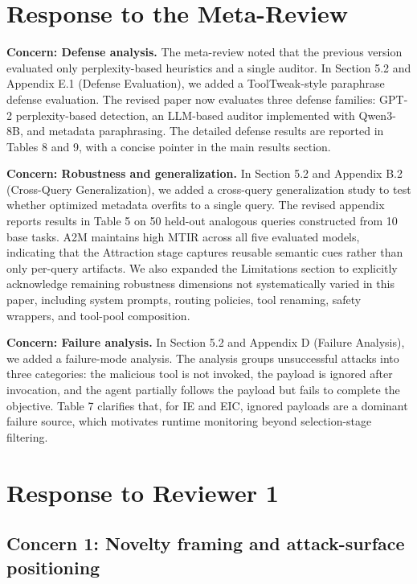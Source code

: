 \documentclass[11pt]{article}
\begin{document}
\section{Response to the Meta-Review}

\textbf{Concern: Defense analysis.}
The meta-review noted that the previous version evaluated only
perplexity-based heuristics and a single auditor.
In Section 5.2 and Appendix E.1 (Defense Evaluation),
we added a ToolTweak-style paraphrase defense evaluation.
The revised paper now evaluates three defense families:
GPT-2 perplexity-based detection,
an LLM-based auditor implemented with Qwen3-8B,
and metadata paraphrasing.
The detailed defense results are reported in Tables 8 and 9,
with a concise pointer in the main results section.

\textbf{Concern: Robustness and generalization.}
In Section 5.2 and Appendix B.2 (Cross-Query Generalization),
we added a cross-query generalization study
to test whether optimized metadata overfits to a single query.
The revised appendix reports results in Table 5
on 50 held-out analogous queries
constructed from 10 base tasks.
A2M maintains high MTIR across all five evaluated models,
indicating that the Attraction stage captures reusable semantic cues
rather than only per-query artifacts.
We also expanded the Limitations section to explicitly acknowledge
remaining robustness dimensions not systematically varied in this paper,
including system prompts, routing policies, tool renaming,
safety wrappers, and tool-pool composition.

\textbf{Concern: Failure analysis.}
In Section 5.2 and Appendix D (Failure Analysis),
we added a failure-mode analysis.
The analysis groups unsuccessful attacks into three categories:
the malicious tool is not invoked,
the payload is ignored after invocation,
and the agent partially follows the payload
but fails to complete the objective.
Table 7 clarifies that, for IE and EIC,
ignored payloads are a dominant failure source,
which motivates runtime monitoring beyond selection-stage filtering.

\section{Response to Reviewer 1}

\subsection*{Concern 1: Novelty framing and attack-surface positioning}
\end{document}
